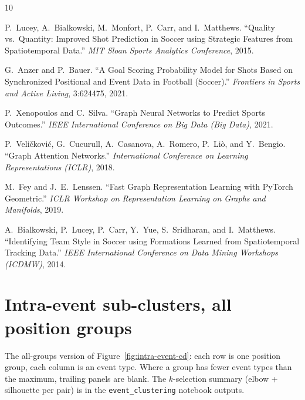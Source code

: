 \documentclass[11pt,twocolumn]{article}
\begin{document}

\begin{thebibliography}{10}

P.~Lucey, A.~Bialkowski, M.~Monfort, P.~Carr, and I.~Matthews.
``Quality vs.\ Quantity: Improved Shot Prediction in Soccer using
Strategic Features from Spatiotemporal Data.''
\emph{MIT Sloan Sports Analytics Conference}, 2015.

G.~Anzer and P.~Bauer.
``A Goal Scoring Probability Model for Shots Based on Synchronized
Positional and Event Data in Football (Soccer).''
\emph{Frontiers in Sports and Active Living}, 3:624475, 2021.

P.~Xenopoulos and C.~Silva.
``Graph Neural Networks to Predict Sports Outcomes.''
\emph{IEEE International Conference on Big Data (Big Data)}, 2021.

P.~Veli\v{c}kovi\'c, G.~Cucurull, A.~Casanova, A.~Romero, P.~Li\`o, and
Y.~Bengio.
``Graph Attention Networks.''
\emph{International Conference on Learning Representations (ICLR)}, 2018.

M.~Fey and J.~E.~Lenssen.
``Fast Graph Representation Learning with PyTorch Geometric.''
\emph{ICLR Workshop on Representation Learning on Graphs and Manifolds},
2019.

A.~Bialkowski, P.~Lucey, P.~Carr, Y.~Yue, S.~Sridharan, and I.~Matthews.
``Identifying Team Style in Soccer using Formations Learned from
Spatiotemporal Tracking Data.''
\emph{IEEE International Conference on Data Mining Workshops (ICDMW)},
2014.

\end{thebibliography}

\appendix
\onecolumn %
\section{Intra-event sub-clusters, all position groups}
\label{app:intra-event-all}
The all-groups version of Figure~\ref{fig:intra-event-cd}: each row is
one position group, each column is an event type. Where a group has
fewer event types than the maximum, trailing panels are blank. The
$k$-selection summary (elbow + silhouette per pair) is in the
\texttt{event\_clustering} notebook outputs.
\end{document}
